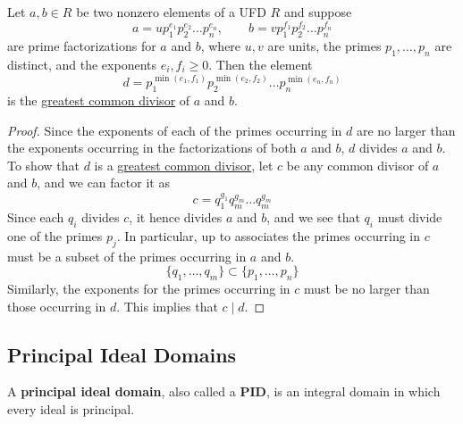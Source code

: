   \begin{theorem}
    \label{thm:gcd-in-a-ufd}
    Let $a, b \in R$ be two nonzero elements of a UFD $R$ and suppose 
    \begin{equation}
      a = u p_1^{e_1} p_2^{e_2} \ldots  p_n^{e_n}, \qquad b = v p_1^{f_1} p_2^{f_2} \ldots p_n^{f_n}
    \end{equation}
    are prime factorizations for $a$ and $b$, where $u, v$ are units, the primes $p_1, \ldots, p_n$ are distinct, and the exponents $e_i, f_i \geq 0$. Then the element 
    \begin{equation}
      d = p_1^{\min(e_1, f_1)} p_2^{\min(e_2, f_2)} \ldots p_n^{\min(e_n, f_n)}
    \end{equation}
    is the \hyperref[def:greatest-common-divisor]{greatest common divisor} of $a$ and $b$. 
  \end{theorem}
  \begin{proof}
    Since the exponents of each of the primes occurring in $d$ are no larger than the exponents occurring in the factorizations of both $a$ and $b$, $d$ divides $a$ and $b$. To show that $d$ is a \hyperref[def:greatest-common-divisor]{greatest common divisor}, let $c$ be any common divisor of $a$ and $b$, and we can factor it as 
    \begin{equation}
      c = q_1^{g_1} q_m^{g_m} \ldots q_m^{g_m}
    \end{equation}
    Since each $q_i$ divides $c$, it hence divides $a$ and $b$, and we see that $q_i$ must divide one of the primes $p_j$. In particular, up to associates the primes occurring in $c$ must be a subset of the primes occurring in $a$ and $b$. 
    \begin{equation}
      \{q_1, \ldots, q_m\} \subset \{p_1, \ldots, p_n\}
    \end{equation}
    Similarly, the exponents for the primes occurring in $c$ must be no larger than those occurring in $d$. This implies that $c \mid d$. 
  \end{proof}

\subsection{Principal Ideal Domains}

  \begin{definition}
    \label{def:principal-ideal-domain}
    A \textbf{principal ideal domain}, also called a \textbf{PID}, is an integral domain in which every ideal is principal.  
  \end{definition}

